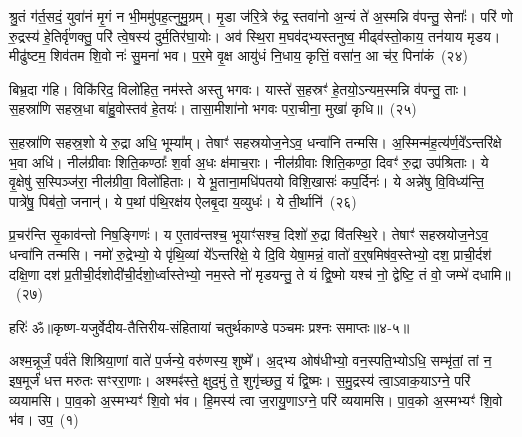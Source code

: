 श्रु॒तं ग॑र्त॒सदं॒ युवा॑नं मृ॒गं न भी॒ममु॑पह॒त्नुमु॒ग्रम्। मृ॒डा ज॑रि॒त्रे रु॑द्र॒ स्तवा॑नो अ॒न्यं ते॑ अ॒स्मन्नि व॑पन्तु॒ सेनाः᳚। परि॑ णो रु॒द्रस्य॑ हे॒तिर्वृ॑णक्तु॒ परि॑ त्वे॒षस्य॑ दुर्म॒तिर॑घा॒योः। अव॑ स्थि॒रा म॒घव॑द्भ्यस्तनुष्व॒ मीढ्व॑स्तो॒काय॒ तन॑याय मृडय। मीढु॑ष्टम॒ शिव॑तम शि॒वो नः॑ सु॒मना॑ भव। प॒र॒मे वृ॒क्ष आयु॑धं नि॒धाय॒ कृत्तिं॒ वसा॑न॒ आ च॑र॒ पिना॑कं~(२४)

बिभ्र॒दा ग॑हि। विकि॑रिद॒ विलो॑हित॒ नम॑स्ते अस्तु भगवः। यास्ते॑ स॒हस्रꣳ॑ हे॒तयो॒\-ऽन्यम॒स्मन्नि व॑पन्तु॒ ताः। स॒हस्रा॑णि सहस्र॒धा बा॑हु॒वोस्तव॑ हे॒तयः॑। तासा॒मीशा॑नो भगवः परा॒चीना॒ मुखा॑ कृधि॥~(२५)

{\anuvakamend[{अ॒स्मिꣴ स्त॒नुवः॑ स्तु॒हि पिना॑क॒मेका॒न्नत्रि॒ꣳ॒शच्च॑}]}%

स॒हस्रा॑णि सहस्र॒शो ये रु॒द्रा अधि॒ भूम्या᳚म्। तेषाꣳ॑ सहस्रयोज॒ने\-ऽव॒ धन्वा॑नि तन्मसि। अ॒स्मिन्म॑ह॒त्य॑र्ण॒वे᳚\-ऽ\-न्तरि॑क्षे भ॒वा अधि॑। नील॑ग्रीवाः शिति॒कण्ठाः᳚ श॒र्वा अ॒धः क्ष॑माच॒राः। नील॑ग्रीवाः शिति॒कण्ठा॒ दिवꣳ॑ रु॒द्रा उप॑श्रिताः। ये वृ॒क्षेषु॑ स॒स्पिञ्ज॑रा॒ नील॑ग्रीवा॒ विलो॑हिताः। ये भू॒ताना॒मधि॑पतयो विशि॒खासः॑ कप॒र्दिनः॑। ये अन्ने॑षु वि॒विध्य॑न्ति॒ पात्रे॑षु॒ पिब॑तो॒ जनान्॑। ये प॒थां प॑थि॒रक्ष॑य ऐलबृ॒दा य॒व्युधः॑। ये ती॒र्थानि॑~(२६)

प्र॒चर॑न्ति सृ॒काव॑न्तो निष॒ङ्गिणः॑। य ए॒ताव॑न्तश्च॒ भूयाꣳ॑सश्च॒ दिशो॑ रु॒द्रा वि॑तस्थि॒रे। तेषाꣳ॑ सहस्रयोज॒ने\-ऽव॒ धन्वा॑नि तन्मसि। नमो॑ रु॒द्रेभ्यो॒ ये पृ॑थि॒व्यां ये᳚\-ऽन्तरि॑क्षे॒ ये दि॒वि येषा॒मन्नं॒ वातो॑ व॒र्॒\mbox{}षमिष॑व॒स्तेभ्यो॒ दश॒ प्राची॒र्दश॑ दक्षि॒णा दश॑ प्र॒तीची॒र्दशोदी॑ची॒र्दशो॒र्ध्वास्तेभ्यो॒ नम॒स्ते नो॑ मृडयन्तु॒ ते यं द्वि॒ष्मो यश्च॑ नो॒ द्वेष्टि॒ तं वो॒ जम्भे॑ दधामि॥~(२७)

{\anuvakamend[{ती॒र्थानि॒ यश्च॒ षट्च॑}]}%

{हरिः॑ ॐ}{॥कृष्ण-यजुर्वेदीय-तैत्तिरीय-संहितायां चतुर्थकाण्डे पञ्चमः प्रश्नः समाप्तः॥४-५॥}

\setcounter{anuvakam}{0}
अश्म॒न्नूर्जं॒ पर्व॑ते शिश्रिया॒णां वाते॑ प॒र्जन्ये॒ वरु॑णस्य॒ शुष्मे᳚। अ॒द्भ्य ओष॑धीभ्यो॒ वन॒स्पति॒भ्यो\-ऽधि॒ सम्भृ॑तां॒ तां न॒ इष॒मूर्जं॑ धत्त मरुतः सꣳररा॒णाः। अश्मꣴ॑स्ते॒ क्षुद॒मुं ते॒ शुगृ॑च्छतु॒ यं द्वि॒ष्मः। स॒मु॒द्रस्य॑ त्वा॒\-ऽवाक॒या\-ऽ\-ग्ने॒ परि॑ व्ययामसि। पा॒व॒को अ॒स्मभ्यꣳ॑ शि॒वो भ॑व। हि॒मस्य॑ त्वा ज॒रायु॒णा\-ऽ\-ग्ने॒ परि॑ व्ययामसि। पा॒व॒को अ॒स्मभ्यꣳ॑ शि॒वो भ॑व। उप॒~(१)

